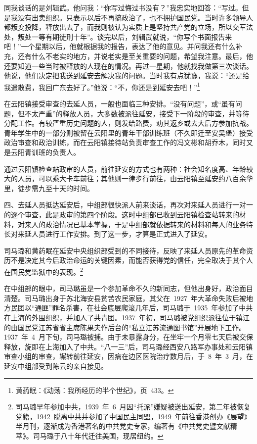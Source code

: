 \begin{quoting}
同我谈话的是刘辑武。他问我：“你写过悔过书没有？”我忠实地回答：“写过。但是我没有出卖组织。只表示以后不再搞政治了，也不拥护国民党。当时许多领导人都叛变投降，释放出去了，而我则被认为实质上是坚持共产党的立场，所以交军法处，叛处一等有期徒刑十年”。谈完以后，刘辑武就说，“你写个书面报告来吧！”一个星期以后，他就根据我的报告，表达了他的意见。并问我还有什么补充，还有什么不老实的地方，并说老实是至关重要的问题，希望我注意。最后，他还要知道一些当时被释放的人现在的情况。再过一星期，他就找我做第三次谈话。他说，他们决定把我送到延安去解决我的问题。当时我有点犹豫，我说：“还是给我遣散费，我回广东去好了。”他说：“不，你还是到延安去吧！”\footnote{黄药眠：《动荡：我所经历的半个世纪》，页~433。}
\end{quoting}在云阳镇接受审查的去延人员，一般也面临三种安排。“没有问题”，或“虽有问题，但不太严重”的释放人员，大多数被派往延安，接受下一阶段的审查，并等待分配工作。有较严重历史问题的人，则发给路费，劝其返乡或去大后方参加抗战。青年学生中的一部分则被留在云阳里的青年干部训练班（不久即迁至安吴堡）接受政治审查和政治训练，而在云阳镇接待站负责审查工作的冯文彬和胡乔木，同时又是云阳青训班的负责人。

通过云阳镇检查站政审的人员，前往延安的方式也有两种：社会知名度高、年龄较大的人员，可以乘大卡车前往；其他则一律步行前往，由云阳镇至延安约八百余华里，徒步需九至十天的时间。

四、去延人员抵达延安后，中组部很快派人前来谈话，再次对来延人员进行一对一的逐个审查，此是政审的第四个阶段。这时中组部已收到云阳镇检查站转来的材料，对来人的政治情况已基本掌握，于是中组部就依据转来的材料和每人的业务特长对来延人员进行工作安排。到了这一步，才算是正式进入了延安。

司马璐和黄药眠在延安中央组织部受到的不同接待，反映了来延人员原先的革命资历不是决定其今后政治命运的关键因素，而能否获得党的信任，完全取决于其个人在国民党监狱中的表现。\footnote{司马璐早年参加中共，1939~年~6~月因“托派”嫌疑被送出延安，第二年被恢复党籍，1942~脱离中共并参加了中国民主同盟，1949~年前往香港创办《展望》半月刊，逐渐成为香港著名的中共党史专家，编著有《中共党史暨文献精萃》。司马璐于八十年代迁往美国，现居纽约。}

在中组部的眼中，司马璐虽是一个参加革命不久的新同志，但他出身好，政治面目清楚。司马璐出身于苏北海安县贫苦农民家庭，其父在~1927~年大革命失败后被地方民团以“通匪”罪名杀害，在社会底层爬滚几年后，司马璐于~1935~年参加了中共在上海的外围组织，并加人了共青团。1937~年初，司马璐被党组织派往位于镇江的由国民党江苏省省主席陈果夫作后台的“私立江苏流通图书馆”开展地下工作。1937~年~4~月下旬，司马璐被捕。由于未暴露身分，在坐牢一个月零七天后被交保释放，旋即在上海加入了中共。“八一三”后，司马璐经西安八路军办事处和云阳镇审查小组的审查，辗转前往延安，因病在边区医院治疗数月后，于~8~年~3~月，在延安中组部受到陈云的亲自接见。

